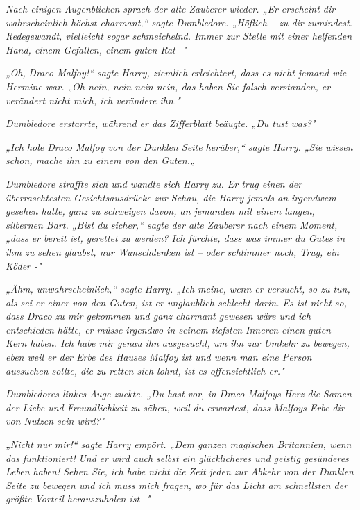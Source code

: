 {\emph{Nach einigen Augenblicken sprach der alte Zauberer wieder. „Er erscheint dir wahrscheinlich höchst charmant,“ sagte Dumbledore. „Höflich -- zu dir zumindest. Redegewandt, vielleicht sogar schmeichelnd. Immer zur Stelle mit einer helfenden Hand, einem Gefallen, einem guten Rat -"}

\emph{„Oh,} \emph{\emph{Draco Malfoy!}“ sagte Harry, ziemlich erleichtert, dass es nicht jemand wie Hermine war. „Oh nein, nein nein nein, das haben Sie falsch verstanden, er verändert nicht mich, ich verändere ihn."}

\emph{Dumbledore erstarrte, während er das Zifferblatt beäugte. „Du tust} \emph{\emph{was?}"}

\emph{„Ich hole Draco Malfoy von der Dunklen Seite herüber,“ sagte Harry. „Sie wissen schon, mache ihn zu einem von den Guten.„}

\emph{Dumbledore straffte sich und wandte sich Harry zu. Er trug einen der überraschtesten Gesichtsausdrücke zur Schau, die Harry jemals an irgendwem gesehen hatte, ganz zu schweigen davon, an jemanden mit einem langen, silbernen Bart. „Bist du sicher,“ sagte der alte Zauberer nach einem Moment, „dass er bereit ist, gerettet zu werden? Ich fürchte, dass was immer du Gutes in ihm zu sehen glaubst, nur Wunschdenken ist -- oder schlimmer noch, Trug, ein Köder -"}

\emph{„Ähm, unwahrscheinlich,“ sagte Harry. „Ich meine, wenn er versucht, so zu tun, als sei er einer von den Guten, ist er unglaublich schlecht darin. Es ist nicht so, dass Draco zu mir gekommen und ganz charmant gewesen wäre und ich entschieden hätte, er müsse irgendwo in seinem tiefsten Inneren einen guten Kern haben. Ich habe mir genau ihn ausgesucht, um ihn zur Umkehr zu bewegen, eben weil er der Erbe des Hauses Malfoy ist und wenn man eine Person aussuchen sollte, die zu retten sich lohnt, ist es offensichtlich er."}

\emph{Dumbledores linkes Auge zuckte. „Du hast vor, in Draco Malfoys Herz die Samen der Liebe und Freundlichkeit zu sähen, weil du erwartest, dass Malfoys Erbe dir von Nutzen sein wird?"}

\emph{„Nicht nur} \emph{\emph{mir!}“ sagte Harry empört. „Dem ganzen magischen Britannien, wenn das funktioniert!} \emph{\emph{Und}} \emph{er wird auch selbst ein glücklicheres und geistig gesünderes Leben haben! Sehen Sie, ich habe nicht die Zeit} \emph{\emph{jeden}} \emph{zur Abkehr von der Dunklen Seite zu bewegen und ich muss mich fragen, wo für das Licht am schnellsten der größte Vorteil herauszuholen ist -"}

}
